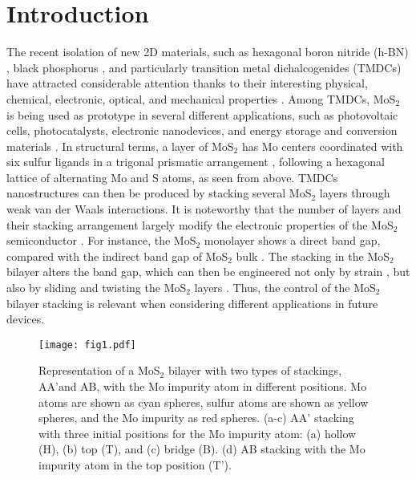 \documentclass[pra,twocolumn,preprintnumbers,amsmath,amssymb]{revtex4}
\begin{document}

\maketitle
\date{Today}
\section{Introduction} \label{Intro}

The recent isolation of new 2D materials, such as hexagonal boron nitride (h-BN) \cite{novoselov2005two}, black phosphorus \cite{castellanos2014isolation}, and particularly transition metal dichalcogenides (TMDCs) \cite{yang1991structure} have attracted considerable attention thanks to their interesting physical, chemical, electronic, optical, and mechanical properties \cite{splendiani2010emerging,chhowalla2013chemistry,wang2012electronics,PhysRevB.88.245436,radisavljevic2011single,oriol2013,Hualing2012,castellanos2012}.
Among TMDCs,  MoS$_{2}$ is being used as prototype in several different applications, such as photovoltaic cells, photocatalysts, electronic nanodevices, and energy storage and conversion materials \cite{Book1}.
In structural terms, a layer of MoS$_{2}$ has Mo centers coordinated with six sulfur ligands in a trigonal prismatic arrangement \cite{liu2015electronic,roldan2014electronic}, following a hexagonal lattice of alternating Mo and S atoms, as seen from above.
TMDCs nanostructures can then be produced by stacking several MoS$_2$ layers through weak van der Waals interactions. It is noteworthy that the number of layers and their stacking arrangement largely modify the electronic properties of the MoS$_2$ semiconductor \cite{ataca2011comparative,lopez2016band,yuan2016evolution,he2014stacking,yan2016identifying}.
For instance, the MoS$_{2}$ monolayer shows a direct band gap, compared with the indirect band gap of MoS$_{2}$ bulk  \cite{mahatha2012electronic,zhao2013origin,kosmider2013electronic,padilha2014nature}.
The stacking in the MoS$_{2}$ bilayer alters the band gap, which can then be engineered not only by strain \cite{dong2014theoretical,sharma2014strain}, but  also by sliding \cite{levita2014sliding} and twisting the MoS$_{2}$ layers \cite{liu2014evolution}.
Thus, the control of the MoS$_{2}$ bilayer stacking is relevant when considering different applications in future devices.

\begin{figure}[t]
\centering
\texttt{[image: fig1.pdf]}
\caption{Representation of a MoS$_{2}$ bilayer with two types of stackings, AA'and AB, with the Mo impurity atom in different positions. Mo atoms are shown as cyan spheres, sulfur atoms are shown as yellow spheres, and the Mo impurity as red spheres. (a-c)  AA' stacking with three initial positions for the Mo impurity atom: (a) hollow (H), (b) top (T), and (c) bridge (B). (d) AB stacking with the Mo impurity atom in the top position (T').}\label{fig1}
\end{figure}
\end{document}
